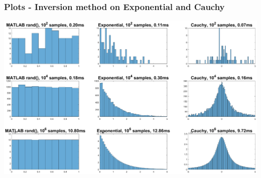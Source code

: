 \documentclass[10pt, serif, mathserif]{beamer}
\begin{document}
\begin{frame}
	\frametitle{Plots - Inversion method on Exponential and Cauchy}
	\centering \includegraphics[width=.9\textwidth, trim=100mm 100mm 70mm 70mm]{../inversion.eps}
\end{frame}
\end{document}

